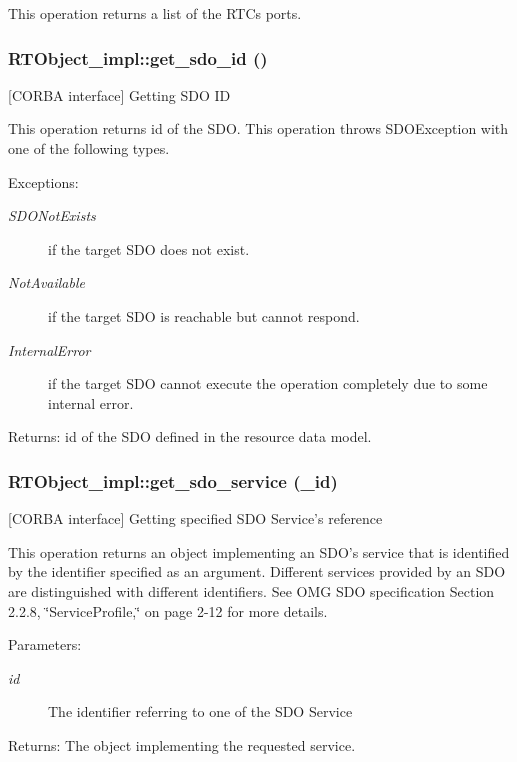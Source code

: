 This operation returns a list of the RTCs ports.
\subsubsection{\setlength{\rightskip}{0pt plus 5cm}RTObject\_\-impl::get\_\-sdo\_\-id ()}\label{classRTObject__impl_RTObject__impla37}


[CORBA interface] Getting SDO ID 

This operation returns id of the SDO. This operation throws SDOException with one of the following types.

\begin{Desc}
\item[Exceptions:]
\begin{description}
\item[{\em SDONot\-Exists}]if the target SDO does not exist. \item[{\em Not\-Available}]if the target SDO is reachable but cannot respond. \item[{\em Internal\-Error}]if the target SDO cannot execute the operation completely due to some internal error. \end{description}
\end{Desc}
\begin{Desc}
\item[Returns:]id of the SDO defined in the resource data model.\end{Desc}
\subsubsection{\setlength{\rightskip}{0pt plus 5cm}RTObject\_\-impl::get\_\-sdo\_\-service (\_\-id)}\label{classRTObject__impl_RTObject__impla42}


[CORBA interface] Getting specified SDO Service's reference 

This operation returns an object implementing an SDO's service that is identified by the identifier specified as an argument. Different services provided by an SDO are distinguished with different identifiers. See OMG SDO specification Section 2.2.8, \char`\"{}Service\-Profile,\char`\"{} on page 2-12 for more details.

\begin{Desc}
\item[Parameters:]
\begin{description}
\item[{\em id}]The identifier referring to one of the SDO Service \end{description}
\end{Desc}
\begin{Desc}
\item[Returns:]The object implementing the requested service.\end{Desc}
